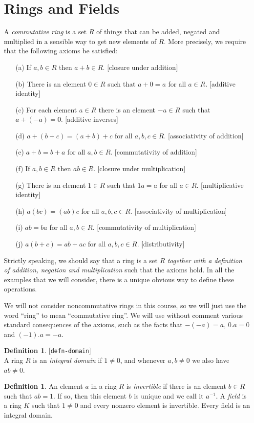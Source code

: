 \documentclass{amsart}
\newcommand{\lbl}[1]{\label{#1}\textup{[\texttt{#1}]}\ \\}
\newcommand{\lbl}{\label}
\renewcommand{\:}{\colon}
\theoremstyle{definition}
\newtheorem{definition}[theorem]{Definition}
\begin{document}
\section{Rings and Fields}
\label{sec-rings}

A \emph{commutative ring} is a set $R$ of things that can be added,
negated and multiplied in a sensible way to get new elements of $R$.
More precisely, we require that the following axioms be satisfied:
\begin{itemize}
 \item[(a)] If $a,b\in R$ then $a+b\in R$.
  [closure under addition]
 \item[(b)] There is an element $0\in R$ such that $a+0=a$ for all
  $a\in R$.
  [additive identity]
 \item[(c)] For each element $a\in R$ there is an element $-a\in R$
  such that $a+(-a)=0$. 
  [additive inverses]
 \item[(d)] $a+(b+c)=(a+b)+c$ for all $a,b,c\in R$.
  [associativity of addition]
 \item[(e)] $a+b=b+a$ for all $a,b\in R$.
  [commutativity of addition]
 \item[(f)] If $a,b\in R$ then $ab\in R$.
  [closure under multiplication]
 \item[(g)] There is an element $1\in R$ such that $1a=a$ for all
  $a\in R$.
  [multiplicative identity]
 \item[(h)] $a(bc)=(ab)c$ for all $a,b,c\in R$.
  [associativity of multiplication]
 \item[(i)] $ab=ba$ for all $a,b\in R$.
  [commutativity of multiplication]
 \item[(j)] $a(b+c)=ab+ac$ for all $a,b,c\in R$.
  [distributivity]
\end{itemize}
Strictly speaking, we should say that a ring is a set $R$
\emph{together with a definition of addition, negation and
  multiplication} such that the axioms hold.  In all the examples that
we will consider, there is a unique obvious way to define these
operations.

We will not consider noncommutative rings in this course, so we will
just use the word ``ring'' to mean ``commutative ring''.  We will use
without comment various standard consequences of the axioms, such as
the facts that $-(-a)=a$, $0.a=0$ and $(-1).a=-a$.

\begin{definition}\lbl{defn-domain}
 A ring $R$ is an \emph{integral domain} if $1\neq 0$, and whenever
 $a,b\neq 0$ we also have $ab\neq 0$.
\end{definition}
\begin{definition}
 An element $a$ in a ring $R$ is \emph{invertible} if there is an
 element $b\in R$ such that $ab=1$.  If so, then this element $b$ is
 unique and we call it $a^{-1}$.  A \emph{field} is a ring $K$ such
 that $1\neq 0$ and every nonzero element is invertible.  Every field
 is an integral domain.
\end{definition}
\end{document}
